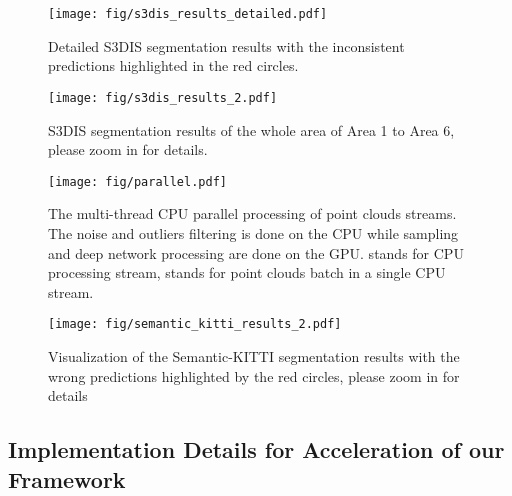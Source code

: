 \documentclass[journal]{IEEEtran}
\begin{document}
\begin{figure*}[ht]
\centering
\texttt{[image: fig/s3dis\_results\_detailed.pdf]}
\caption{Detailed S3DIS segmentation results with the inconsistent predictions highlighted in the red circles.}
\label{fig_s3dis_detail}
\end{figure*}


\begin{figure*}[htbp!]
\centering
\texttt{[image: fig/s3dis\_results\_2.pdf]}
\caption{S3DIS segmentation results of the whole area of Area 1 to Area 6, please zoom in for details.}
\label{fig_s3dis}
\vspace{-3.99mm}
\end{figure*}



\begin{figure}[ht]
\centering
\texttt{[image: fig/parallel.pdf]}
\caption{The multi-thread CPU parallel processing of point clouds streams. The noise and outliers filtering is done on the CPU while sampling and deep network processing are done on the GPU.  stands for  CPU processing stream,  stands for  point clouds batch in a single CPU stream.}
\label{fig_para}
\vspace{-6.00mm}
\end{figure}


\begin{figure*}[htbp!]
\centering
\texttt{[image: fig/semantic\_kitti\_results\_2.pdf]}
\caption{Visualization of the Semantic-KITTI segmentation results with the wrong predictions highlighted by the red circles, please zoom in for details}
\label{fig_Skitti}
\end{figure*}


\subsection{Implementation Details for Acceleration of our Framework}
\end{document}
